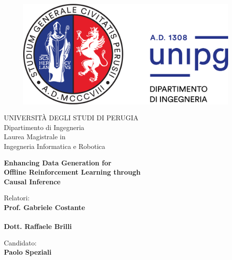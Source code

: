 \begin{titlepage}
\begin{figure}[!htb]
    \centering
    \includegraphics[keepaspectratio=true,scale=0.5]{figures/logounipg2021}
\end{figure}

\begin{center}
    \LARGE{UNIVERSIT\`A DEGLI STUDI DI PERUGIA}
    \vspace{5mm}
    \\ \Large{Dipartimento di Ingegneria}
    \vspace{5mm}
    \\ \LARGE{Laurea Magistrale in \\ Ingegneria Informatica e Robotica}
\end{center}

\vspace{15mm}
\begin{center}
    {\LARGE{\bf Enhancing Data Generation for\\ \vspace{2mm} Offline Reinforcement Learning through \\ \vspace{5mm} Causal Inference}}
    
    
\end{center}
\vspace{30mm}

\begin{minipage}[t]{.45\textwidth}
	{\large{Relatori:}{\normalsize\vspace{3mm}
	\bf\\ \large{Prof. Gabriele Costante}}\\
    {\normalsize\vspace{-3mm}
	\bf\\ \large{Dott. Raffaele Brilli}}}
\end{minipage}
\hfill
\begin{minipage}[t]{0.45\textwidth}\raggedleft
	{\large{Candidato:}{\normalsize\vspace{3mm}
    \bf\\ \large{Paolo Speziali}}}
\end{minipage}

\vspace{25mm}
\hrulefill
\\

\end{titlepage}